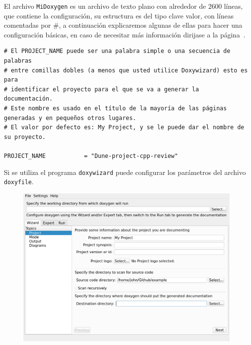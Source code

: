 \begin{frame}
	El archivo \lstinline{MiDoxygen} es un archivo de texto plano con
	alrededor de $2600$ líneas, que contiene la configuración, su
	estructura es del tipo clave valor, con líneas comentadas por \#, a
	continuación explicaremos algunas de ellas para hacer una
	configuración básicas, en caso de necesitar más información dirijase
	a la página~\cite{Doxygen2021}.%
\end{frame}

\begin{frame}[fragile]\LARGE
	\begin{lstlisting}
# El PROJECT_NAME puede ser una palabra simple o una secuencia de palabras 
# entre comillas dobles (a menos que usted utilice Doxywizard) esto es para 
# identificar el proyecto para el que se va a generar la documentación.
# Este nombre es usado en el título de la mayoría de las páginas generadas y en pequeños otros lugares.
# El valor por defecto es: My Project, y se le puede dar el nombre de su proyecto.

PROJECT_NAME           = "Dune-project-cpp-review"
\end{lstlisting}
\end{frame}

\begin{frame}
	Si se utiliza el programa \lstinline{doxywizard} puede configurar los parámetros del archivo \lstinline{doxyfile}.

	\begin{figure}[ht!]
		\centering
		\includegraphics[scale=0.2]{wizard_capture.png}
	\end{figure}
\end{frame}

